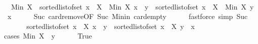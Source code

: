\begin{isabellebody}
\ \ \isamarkupfalse%
\ \isamarkupfalse%
\ {\isachardoublequoteopen}{\isasymdots}\ {\isacharequal}{\kern0pt}\ Min\ X\ {\isacharhash}{\kern0pt}\ sorted{\isacharunderscore}{\kern0pt}list{\isacharunderscore}{\kern0pt}of{\isacharunderscore}{\kern0pt}set\ {\isacharbraceleft}{\kern0pt}x\ {\isasymin}\ {\isacharparenleft}{\kern0pt}X\ {\isacharminus}{\kern0pt}\ {\isacharbraceleft}{\kern0pt}Min\ X{\isacharbraceright}{\kern0pt}{\isacharparenright}{\kern0pt}{\isachardot}{\kern0pt}\ x\ {\isacharless}{\kern0pt}\ y{\isacharbraceright}{\kern0pt}\ {\isacharat}{\kern0pt}\ sorted{\isacharunderscore}{\kern0pt}list{\isacharunderscore}{\kern0pt}of{\isacharunderscore}{\kern0pt}set\ {\isacharbraceleft}{\kern0pt}x\ {\isasymin}\ {\isacharparenleft}{\kern0pt}X\ {\isacharminus}{\kern0pt}\ {\isacharbraceleft}{\kern0pt}Min\ X{\isacharbraceright}{\kern0pt}{\isacharparenright}{\kern0pt}{\isachardot}{\kern0pt}\ y\ {\isasymle}\ x{\isacharbraceright}{\kern0pt}{\isachardoublequoteclose}\isanewline
\ \ \ \ \isamarkupfalse%
\ Suc\ card{\isachardot}{\kern0pt}remove{\isacharbrackleft}{\kern0pt}OF\ Suc{\isacharparenleft}{\kern0pt}{}{\isacharparenright}{\kern0pt}\ Min{\isacharunderscore}{\kern0pt}in{\isacharbrackright}{\kern0pt}\ card{\isachardot}{\kern0pt}empty\isanewline
\ \ \ \ \isamarkupfalse%
\ {\isacharparenleft}{\kern0pt}fastforce\ simp{\isacharcolon}{\kern0pt}\ Suc{\isacharparenleft}{\kern0pt}{}{\isacharparenright}{\kern0pt}{\isacharparenright}{\kern0pt}{\isacharplus}{\kern0pt}\isanewline
\ \ \isamarkupfalse%
\ \isamarkupfalse%
\ {\isachardoublequoteopen}{\isasymdots}\ {\isacharequal}{\kern0pt}\ sorted{\isacharunderscore}{\kern0pt}list{\isacharunderscore}{\kern0pt}of{\isacharunderscore}{\kern0pt}set\ {\isacharparenleft}{\kern0pt}{\isacharbraceleft}{\kern0pt}x\ {\isasymin}\ X{\isachardot}{\kern0pt}\ x\ {\isacharless}{\kern0pt}\ y{\isacharbraceright}{\kern0pt}{\isacharparenright}{\kern0pt}\ {\isacharat}{\kern0pt}\ sorted{\isacharunderscore}{\kern0pt}list{\isacharunderscore}{\kern0pt}of{\isacharunderscore}{\kern0pt}set\ {\isacharbraceleft}{\kern0pt}x\ {\isasymin}\ X{\isachardot}{\kern0pt}\ y\ {\isasymle}\ x{\isacharbraceright}{\kern0pt}{\isachardoublequoteclose}\isanewline
\ \ \isamarkupfalse%
\ {\isacharparenleft}{\kern0pt}cases\ {\isachardoublequoteopen}Min\ X\ {\isacharless}{\kern0pt}\ y{\isachardoublequoteclose}{\isacharparenright}{\kern0pt}\isanewline
\ \ \ \ \isamarkupfalse%
\ True\isanewline
\ \ \ \ \isamarkupfalse%

\end{isabellebody}
